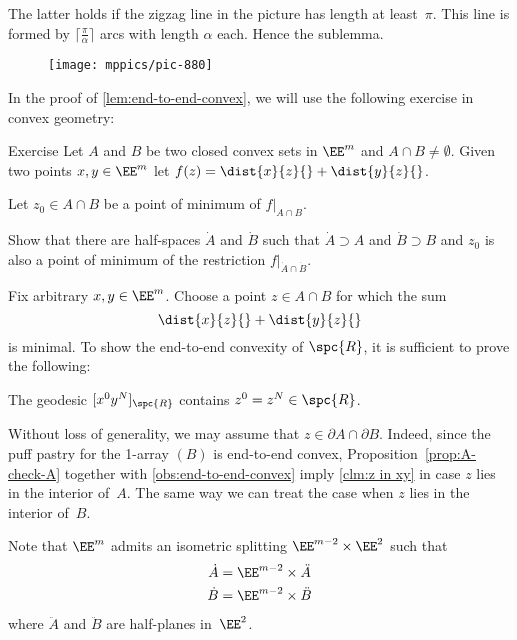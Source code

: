 The latter holds if the zigzag line in the picture has length at least~$\pi$.
This line is formed by $\lceil\tfrac\pi\alpha\rceil$ arcs with length $\alpha$ each.
Hence the sublemma.
\qeds

{

\begin{wrapfigure}{r}{26mm}
\vskip-3mm
\centering
\texttt{[image: mppics/pic-880]}
\end{wrapfigure}

In the proof of \ref{lem:end-to-end-convex}, we will use the following exercise in convex geometry:

\begin{thm}{Exercise}\label{ex:supporting-planes}
Let $A$ and $B$ be two closed convex sets in $\EE^m$ and $A\cap B\ne\emptyset$.
Given two points $x,y\in \EE^m$  let $f(z)=\dist{x}{z}{}+\dist{y}{z}{}$.

Let $z_0\in A\cap B$ be  a point of minimum of $f|_{A\cap B}$.

Show that there are half-spaces $\dot A$ and $\dot B$ such that
$\dot A\supset A$ and $\dot B\supset B$
and $z_0$ is also a point of minimum of the restriction $f|_{\dot A\cap \dot B}$.

\end{thm}

}

Fix arbitrary $x,y\in \EE^m$.
Choose a point $z\in A\cap B$
for which the sum 
\[\dist{x}{z}{}+\dist{y}{z}{}\] 
is minimal.
To show the end-to-end convexity of  $\spc{R}$,
it is sufficient to prove the following:

\begin{clm}{}\label{clm:z in xy}
The geodesic $[x^0y^N]_\spc{R}$ contains $z^0=z^N\in \spc{R}$.
\end{clm}

Without loss of generality, we may assume that $z\in\partial A\cap\partial B$.
Indeed, since the puff pastry for the 1-array $(B)$ is end-to-end convex,
Proposition~\ref{prop:A-check-A} together with \ref{obs:end-to-end-convex}
imply \ref{clm:z in xy} in  case $z$ lies in the interior of~$A$.
The same way we can treat the case when $z$ lies in the interior of~$B$.

Note that $\EE^{m}$ admits 
an
isometric splitting $\EE^{m-2}\times \EE^2$ 
such that 
\begin{align*}
\dot A&=\EE^{m-2}\times \ddot A
\\
\dot B&=\EE^{m-2}\times \ddot B
\end{align*}
where $\ddot A$ and $\ddot B$ are half-planes in~$\EE^2$.

